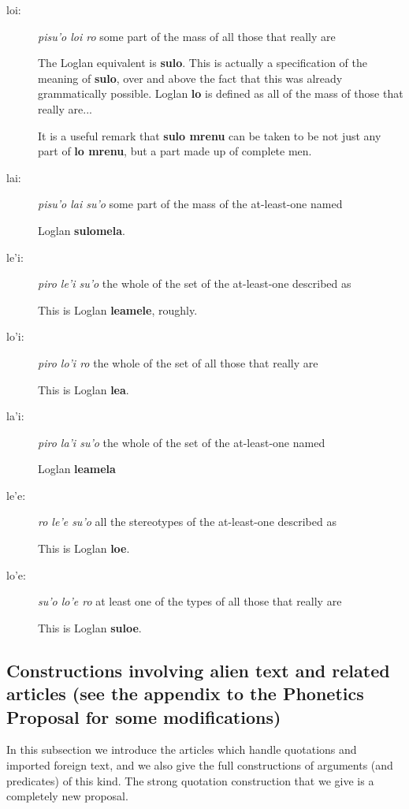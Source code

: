 \documentclass[12pt]{book}
\begin{document}
{\begin{description}
\item[loi: ]	{\em pisu'o loi ro\/} 	some part of the mass of all those that really are

The Loglan equivalent is {\bf sulo}.  This is actually a specification of the meaning of {\bf sulo}, over and above the fact that this was already grammatically possible.  Loglan {\bf lo} is defined as all of the mass of those that really are...

It is a useful remark that {\bf sulo mrenu} can be taken to be not just any part of {\bf lo mrenu}, but a part made up of complete men.

\item[lai: ]	{\em pisu'o lai su'o \/}	some part of the mass of the at-least-one named

Loglan {\bf sulomela}.

\item[le'i: ]	{\em piro le'i su'o \/}	the whole of the set of the at-least-one described as

This is Loglan {\bf leamele}, roughly.

\item[lo'i: ]	{\em piro lo'i ro \/}	 the whole of the set of all those that really are

This is Loglan {\bf lea}.

\item[la'i: ]	{\em piro la'i su'o\/}  	the whole of the set of the at-least-one named

Loglan {\bf leamela}

\item[le'e: ]	{\em ro le'e su'o\/} 	all the stereotypes of the at-least-one described as

This is Loglan {\bf loe}.

\item[lo'e: ]	{\em su'o lo'e ro\/} 	at least one of the types of all those that really are

This is Loglan {\bf suloe}.

\end{description}

\subsection{Constructions involving alien text and related articles (see the appendix to the Phonetics Proposal for some modifications)}

In this subsection we introduce the articles which handle quotations and imported foreign text, and we also give the full constructions of arguments (and predicates) of this kind.   The strong quotation construction that we give is a completely new proposal.

}
\end{document}
